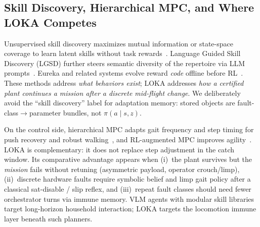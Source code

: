 \subsection{Skill Discovery, Hierarchical MPC, and Where LOKA Competes}
\label{sec:related-skills}

Unsupervised skill discovery maximizes mutual information or state-space coverage to learn latent skills without task rewards~\cite{DIAYN, LSD, CSD}.
Language Guided Skill Discovery (LGSD) further steers semantic diversity of the repertoire via LLM prompts~\cite{LGSD}.
Eureka and related systems evolve reward \emph{code} offline before RL~\cite{Eureka, DrEureka}.
These methods address \emph{what behaviors exist}; LOKA addresses \emph{how a certified plant continues a mission after a discrete mid-flight change}.
We deliberately avoid the ``skill discovery'' label for adaptation memory: stored objects are fault-class$\rightarrow$parameter bundles, not $\pi(a{\mid}s,z)$.

On the control side, hierarchical MPC adapts gait frequency and step timing for push recovery and robust walking~\cite{HierarchicalPushMPC, ALIPWalkMPC}, and RL-augmented MPC improves agility~\cite{RLaugmentedMPC}.
LOKA is complementary: it does not replace step adjustment in the catch window.
Its comparative advantage appears when (i)~the plant survives but the \emph{mission} fails without retuning (asymmetric payload, operator crouch/limp), (ii)~discrete hardware faults require symbolic belief and limp gait policy after a classical sat-disable / slip reflex, and (iii)~repeat fault classes should need fewer orchestrator turns via immune memory.
VLM agents with modular skill libraries~\cite{Being0, UniHSI} target long-horizon household interaction; LOKA targets the locomotion immune layer beneath such planners.

